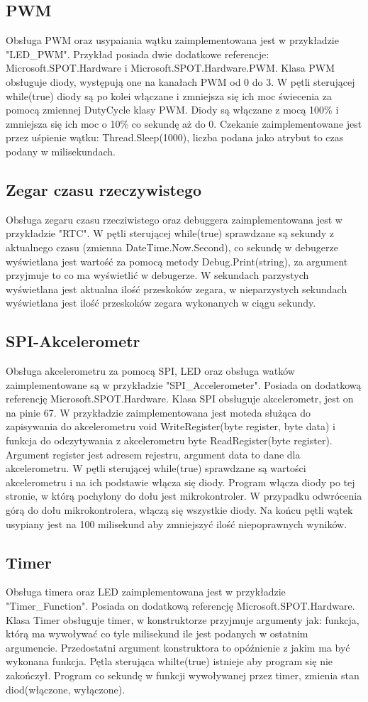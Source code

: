 ﻿\documentclass{article}
\begin{document}
\subsection{PWM}
Obsługa PWM oraz usypaiania wątku zaimplementowana jest w przykładzie "LED\_PWM". Przykład posiada dwie dodatkowe referencje: Microsoft.SPOT.Hardware i Microsoft.SPOT.Hardware.PWM. Klasa PWM obsługuje diody, występują one na kanałach PWM od 0 do 3. W pętli sterującej while(true) diody są po kolei włączane i zmniejsza się ich moc świecenia za pomocą zmiennej DutyCycle klasy PWM. Diody są włączane z mocą 100\% i zmniejsza się ich moc o 10\% co sekundę aż do 0. Czekanie zaimplementowane jest przez uśpienie wątku: Thread.Sleep(1000), liczba podana jako atrybut to czas podany w milisekundach.

\subsection{Zegar czasu rzeczywistego}
Obsługa zegaru czasu rzecziwistego oraz debuggera zaimplementowana jest w przykładzie "RTC". W pętli sterującej while(true) sprawdzane są sekundy z aktualnego czasu (zmienna DateTime.Now.Second), co sekundę w debugerze wyświetlana jest wartość za pomocą metody Debug.Print(string), za argument przyjmuje to co ma wyświetlić w debugerze. W sekundach parzystych wyświetlana jest aktualna ilość przeskoków zegara, w nieparzystych sekundach wyświetlana jest ilość przeskoków zegara wykonanych w ciągu sekundy.

\subsection{SPI-Akcelerometr}
Obsługa akcelerometru za pomocą SPI, LED oraz obsługa watków zaimplementowane są w przykładzie "SPI\_Accelerometer". Posiada on dodatkową referencję Microsoft.SPOT.Hardware. Klasa SPI obsługuje akcelerometr, jest on na pinie 67. W przykładzie zaimplementowana jest moteda służąca do zapisywania do akcelerometru  void WriteRegister(byte register, byte data) i funkcja do odczytywania z akcelerometru byte ReadRegister(byte register). Argument register jest adresem rejestru, argument data to dane dla akcelerometru. W pętli sterującej while(true) sprawdzane są wartości akcelerometru i na ich podstawie włącza się diody. Program włącza diody po tej stronie, w którą pochylony do dołu jest mikrokontroler. W przypadku odwrócenia górą do dołu mikrokontrolera, włączą się wszystkie diody. Na końcu pętli wątek usypiany jest na 100 milisekund aby zmniejszyć ilość niepoprawnych wyników. 

\subsection{Timer}
Obsługa timera oraz LED zaimplementowana jest w przykładzie "Timer\_Function". Posiada on dodatkową referencję Microsoft.SPOT.Hardware. Klasa Timer obsługuje timer, w konstruktorze przyjmuje argumenty jak: funkcja, którą ma wywoływać co tyle milisekund ile jest podanych w ostatnim argumencie. Przedostatni argument konstruktora to opóźnienie z jakim ma być wykonana funkcja. Pętla sterująca whilte(true) {} istnieje aby program się nie zakończył. Program co sekundę w funkcji wywoływanej przez timer, zmienia stan diod(włączone, wyłączone).
\end{document}

